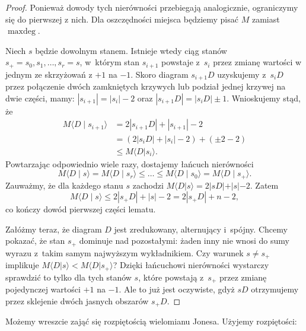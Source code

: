 \begin{proof}
    Ponieważ dowody tych nierówności przebiegają analogicznie, ograniczymy się do pierwszej z nich.
    Dla oszczędności miejsca będziemy pisać $M$ zamiast $\operatorname{maxdeg}$.

    Niech $s$ będzie dowolnym stanem.
    Istnieje wtedy ciąg stanów $s_+ = s_0, s_1, \ldots, s_r = s$, w~którym stan $s_{i+1}$ powstaje z~$s_i$ przez zmianę wartości w jednym ze skrzyżowań z $+1$ na $-1$.
    Skoro diagram $s_{i+1}D$ uzyskujemy z~$s_{i}D$ przez połączenie dwóch zamkniętych krzywych lub podział jednej krzywej na dwie części, mamy: $|s_{i+1}| = |s_i| - 2$ oraz $|s_{i+1}D| = |s_iD| \pm 1$.
    Wnioskujemy stąd, że
    \begin{align}
        M \langle D \mid s_{i+1} \rangle
        & = 2|s_{i+1}D| + |s_{i+1}|-2 \\
        & = (2|s_iD| + |s_i| -2 ) + (\pm 2-2) \\
        & \le M \langle D|s_i\rangle.
    \end{align}
    Powtarzając odpowiednio wiele razy, dostajemy łańcuch nierówności
    \begin{equation}
        M \langle D \mid s \rangle
        =
        M \langle D \mid s_r \rangle
        \le \ldots \le
        M \langle D \mid s_0 \rangle
        =
        M \langle D \mid s_+ \rangle.
    \end{equation}
    Zauważmy, że dla każdego stanu $s$ zachodzi $M \langle D|s \rangle = 2|sD| + |s| - 2$.
    Zatem
    \begin{equation}
        M \langle D \mid s \rangle \le 2 |s_+D| + |s| - 2 = 2|s_+D| + n - 2,
    \end{equation}
    co kończy dowód pierwszej części lematu.

    Załóżmy teraz, że diagram $D$ jest zredukowany, alternujący i~spójny.
    Chcemy pokazać, że stan $s_+$ dominuje nad pozostałymi: żaden inny nie wnosi do sumy wyrazu z~takim samym najwyższym wykładnikiem.
    Czy warunek $s \neq s_+$ implikuje $M\langle D|s\rangle < M\langle D| s_+\rangle$?
    Dzięki łańcuchowi nierówności wystarczy sprawdzić to tylko dla tych stanów $s$, które powstają z~$s_+$ przez zmianę pojedynczej wartości $+1$ na $-1$.
    Ale to już jest oczywiste, gdyż $sD$ otrzymujemy przez sklejenie dwóch jasnych obszarów $s_+ D$.
\end{proof}

Możemy wreszcie zająć się rozpiętością wielomianu Jonesa.
Użyjemy rozpiętości:

